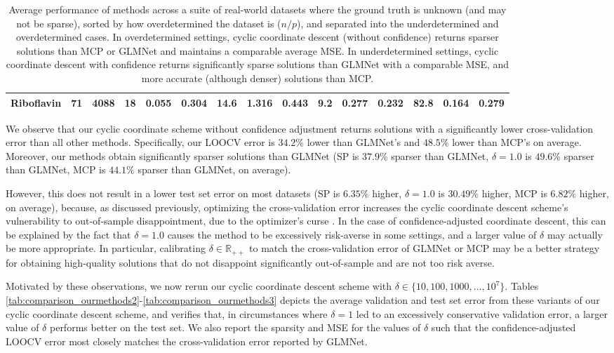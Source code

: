 \documentclass[opre,nonblindrev]{informs3} %
\let\footnote=\endnote
\begin{document}
\begin{table}[h]
\begin{tabular}{@{}l r r r r r r r r r r r r r r@{}}
Riboflavin & 71 & 4088 & 18 & 0.055 & 0.304 & 14.6 & 1.316 & 0.443 & 9.2 & 0.277 & 0.232 & 82.8 & 0.164 & 0.279\\
\bottomrule
\end{tabular}
\caption{Average performance of methods across a suite of real-world datasets where the ground truth is unknown (and may not be sparse), sorted by how overdetermined the dataset is ($n/p$), and separated into the underdetermined and overdetermined cases. In overdetermined settings, cyclic coordinate descent (without confidence) returns sparser solutions than MCP or GLMNet and maintains a comparable average MSE. In underdetermined settings, cyclic coordinate descent with confidence returns significantly sparse solutions than GLMNet with a comparable MSE, and more accurate (although denser) solutions than MCP.
}
\label{tab:comparison_ourmethods}
\end{table}


We observe that our cyclic coordinate scheme without confidence adjustment returns solutions with a significantly lower cross-validation error than all other methods. Specifically, our LOOCV error is $34.2\%$ lower than GLMNet's and $48.5\%$ lower than MCP's on average. %
Moreover, our methods obtain significantly sparser solutions than GLMNet (SP is $37.9\%$ sparser than GLMNet, $\delta=1.0$ is $49.6\%$ sparser than GLMNet, MCP is $44.1\%$ sparser than GLMNet, on average).

However, this does not result in a lower test set error on most datasets (SP is $6.35\%$ higher, $\delta=1.0$ is $30.49\%$ higher, MCP is $6.82\%$ higher, on average), because, as discussed previously, optimizing the cross-validation error increases the cyclic coordinate descent scheme's vulnerability to out-of-sample disappointment, due to the optimizer's curse \citep{smith2006optimizer}. In the case of confidence-adjusted coordinate descent, this can be explained by the fact that $\delta=1.0$ causes the method to be excessively risk-averse in some settings, and a larger value of $\delta$ may actually be more appropriate. In particular, calibrating $\delta \in \mathbb{R}_{++}$ to match the cross-validation error of GLMNet or MCP may be a better strategy for obtaining high-quality solutions that do not disappoint significantly out-of-sample and are not too risk averse.


Motivated by these observations, we now rerun our cyclic coordinate descent scheme with $\delta \in \{10, 100, 1000, \ldots, 10^7\}$. Tables \ref{tab:comparison_ourmethods2}-\ref{tab:comparison_ourmethods3} depicts the average validation and test set error from these variants of our cyclic coordinate descent scheme, and verifies that, in circumstances where $\delta=1$ led to an excessively conservative validation error, a larger value of $\delta$ performs better on the test set. We also report the sparsity and MSE for the values of $\delta$ such that the confidence-adjusted LOOCV error most closely matches the cross-validation error reported by GLMNet.%
\end{document}
